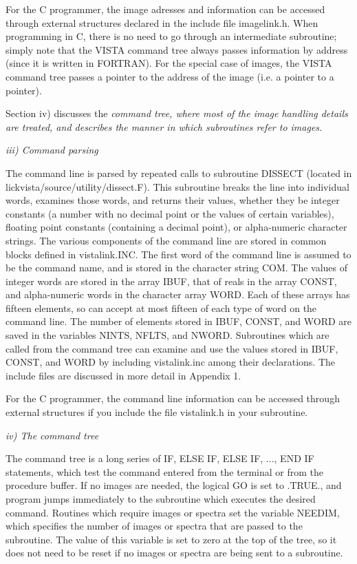    For the C programmer, the image adresses and information can be accessed
through external structures declared in the include file imagelink.h.
When programming in C, there is no need to go through an intermediate
subroutine; simply note that the VISTA command tree always passes information
by address (since it is written in FORTRAN). For the special case of images,
the VISTA command tree passes a pointer to the address of the image (i.e.
a pointer to a pointer).

Section iv) discusses the \it
command tree, \rm where most of the image handling details are treated, and
describes the manner in which subroutines refer to images.
		
\Sskip
\centerline {\it iii) Command parsing\rm}

\vskip 0.25in
	The command line is parsed by repeated calls to subroutine
DISSECT (located in lickvista/source/utility/dissect.F). 
This subroutine breaks the line into individual words,
examines those words, and returns their values, whether they be
integer constants (a number with no decimal point or the values of
certain variables), floating point constants (containing a decimal
point), or alpha-numeric character strings. The various components of
the command line are stored in common blocks defined in vistalink.INC.
The first word of the command line is assumed to be the command name,
and is stored in the character string COM. The values of integer words
are stored in the array IBUF, that of reals in the array CONST, and
alpha-numeric words in the character array WORD. Each of these arrays
has fifteen elements, so \V can accept at most fifteen of each type of
word on the command line.
The number of elements stored in IBUF, CONST, and WORD are saved
in the variables NINTS, NFLTS, and NWORD.
Subroutines which are called from the \V
command tree can examine and use the values stored in IBUF, CONST, and
WORD by including vistalink.inc among their declarations.
The include files are discussed in more detail in Appendix 1. 

   For the C programmer, the command line information can be accessed
through external structures if you include the file vistalink.h in your
subroutine.

\Sskip
\centerline {\it iv) The command tree\rm}

\vskip 0.125in
	The command tree is a long series of IF, ELSE IF, ELSE IF,
..., END IF statements, which test the command entered from the
terminal or from the procedure buffer.  If no images are needed, the
logical GO is set to .TRUE., and program jumps immediately to the
subroutine which executes the desired command. Routines which require
images or spectra set the variable NEEDIM, which specifies the number
of images or spectra that are passed to the subroutine.  The value of
this variable is set to zero at the top of the tree, so it does not
need to be reset if no images or spectra are being sent to a
subroutine. 

